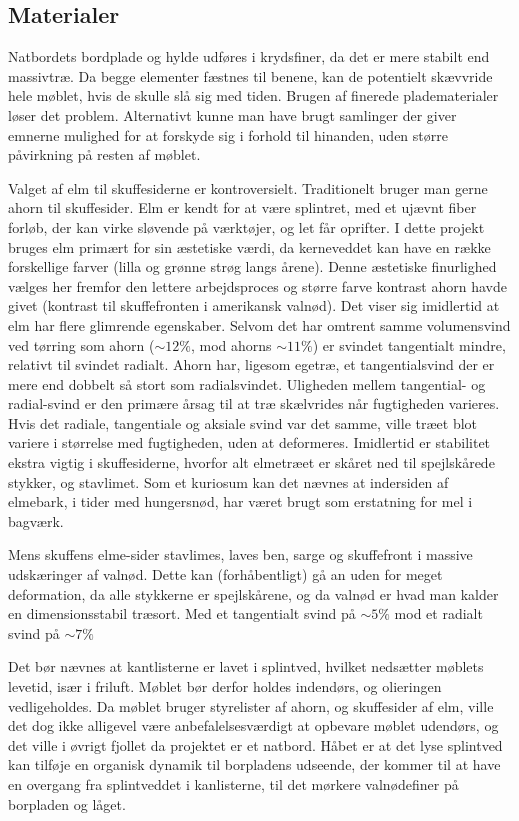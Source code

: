 \subsection*{Materialer}
Natbordets bordplade og hylde udføres i krydsfiner, da det er mere stabilt
end massivtræ. Da begge elementer fæstnes til benene, kan de potentielt
skævvride hele møblet, hvis de skulle slå sig med tiden. Brugen af finerede
pladematerialer løser det problem. Alternativt kunne man have brugt samlinger
der giver emnerne mulighed for at forskyde sig i forhold til hinanden, uden
større påvirkning på resten af møblet.

Valget af elm til skuffesiderne er kontroversielt. Traditionelt bruger man gerne
ahorn til skuffesider.
Elm er kendt for at være splintret, med et ujævnt fiber forløb, der kan virke
sløvende på værktøjer, og let får oprifter\footnotemark. I dette projekt bruges
elm primært for sin æstetiske værdi, da kerneveddet kan have en række
forskellige farver (lilla og grønne strøg langs årene). Denne æstetiske
finurlighed vælges her fremfor den lettere arbejdsproces og større farve
kontrast ahorn havde givet (kontrast til skuffefronten i amerikansk valnød). Det
viser sig imidlertid at elm har flere glimrende egenskaber. Selvom det har
omtrent samme volumensvind ved tørring som ahorn ($\sim12\%$, mod ahorns $\sim11\%$)
er svindet tangentialt mindre, relativt til svindet radialt. Ahorn har, ligesom
egetræ, et tangentialsvind der er mere end dobbelt så stort som radialsvindet.
Uligheden mellem tangential- og radial-svind er den primære årsag til at træ
skælvrides når fugtigheden varieres. Hvis det radiale, tangentiale og aksiale
svind var det samme, ville træet blot variere i størrelse med fugtigheden, uden
at deformeres. Imidlertid er stabilitet ekstra vigtig i skuffesiderne, hvorfor
alt elmetræet er skåret ned til spejlskårede stykker, og stavlimet.
Som et kuriosum kan det nævnes at indersiden af elmebark, i tider
med hungersnød, har været brugt som erstatning for mel i bagværk.

Mens skuffens elme-sider stavlimes, laves ben, sarge og skuffefront i massive
udskæringer af valnød. Dette kan (forhåbentligt) gå an uden for meget
deformation, da alle stykkerne er spejlskårene, og da valnød er hvad man kalder
en dimensionsstabil træsort. Med et tangentialt svind på $\sim 5\%$ mod et
radialt svind på $\sim7\%$

Det bør nævnes at kantlisterne er lavet i splintved, hvilket nedsætter møblets
levetid, især i friluft. Møblet bør derfor holdes indendørs, og olieringen
vedligeholdes. Da møblet bruger styrelister af ahorn, og skuffesider af elm,
ville det dog ikke alligevel være anbefalelsesværdigt at opbevare møblet udendørs,
og det ville i øvrigt fjollet da projektet er et natbord. Håbet er at det lyse
splintved kan tilføje en organisk dynamik til borpladens udseende, der kommer
til at have en overgang fra splintveddet i kanlisterne, til det mørkere
valnødefiner på borpladen og låget.

